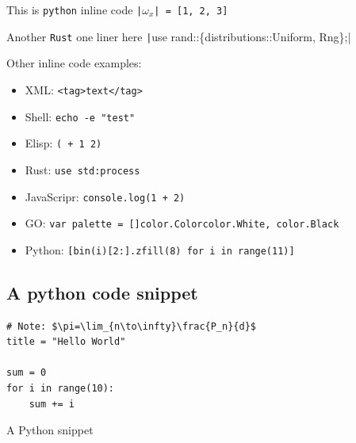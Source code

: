 \documentclass[12pt,a4paper]{article}
\begin{document}
This is \texttt{python} inline code \texttt{|$\omega_x$| = [1, 2, 3]}

Another \texttt{Rust} one liner here \texttt|use rand::\{distributions::Uniform, Rng\};|

Other inline code examples:
\begin{itemize}
\item XML: \texttt{<tag>text</tag>}
\item Shell: \texttt{echo -e "test"}
\item Elisp: \texttt{( + 1 2)}
\item Rust: \texttt{use std:process}
\item JavaScripr: \texttt{console.log(1 + 2)}
\item GO: \texttt{var palette = []color.Color{color.White, color.Black}}
\item Python: \texttt{[bin(i)[2:].zfill(8) for i in range(11)]}
\end{itemize}

\subsection{A python code snippet}
\label{sec:org1eb095d}
\begin{listing}[!ht]
\centering
\begin{verbatim}
# Note: $\pi=\lim_{n\to\infty}\frac{P_n}{d}$
title = "Hello World"

sum = 0
for i in range(10):
    sum += i
\end{verbatim}
\caption{A Python snippet}
\end{listing}
\FloatBarrier
\end{document}
